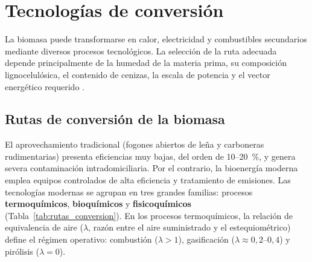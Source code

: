 \chapter{Tecnologías de conversión}
\label{cap:conversion}

La biomasa puede transformarse en calor, electricidad y combustibles secundarios mediante diversos procesos tecnológicos. La selección de la ruta adecuada depende principalmente de la humedad de la materia prima, su composición lignocelulósica, el contenido de cenizas, la escala de potencia y el vector energético requerido \cite{balopi2025review, irena2015heatpower}.

\section{Rutas de conversión de la biomasa}
\label{sec:rutas}

El aprovechamiento tradicional (fogones abiertos de leña y carboneras rudimentarias) presenta eficiencias muy bajas, del orden de 10--20~\%, y genera severa contaminación intradomiciliaria. Por el contrario, la bioenergía moderna emplea equipos controlados de alta eficiencia y tratamiento de emisiones. Las tecnologías modernas se agrupan en tres grandes familias: procesos \textbf{termoquímicos}, \textbf{bioquímicos} y \textbf{fisicoquímicos} (Tabla~\ref{tab:rutas_conversion}). En los procesos termoquímicos, la relación de equivalencia de aire ($\lambda$, razón entre el aire suministrado y el estequiométrico) define el régimen operativo: combustión ($\lambda > 1$), gasificación ($\lambda \approx 0{,}2\text{--}0{,}4$) y pirólisis ($\lambda = 0$).

